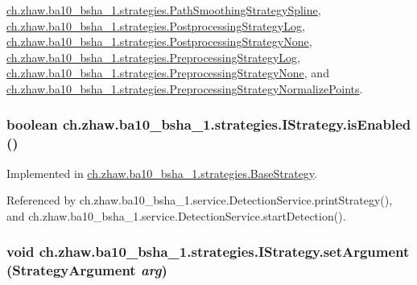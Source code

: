 \hyperlink{classch_1_1zhaw_1_1ba10__bsha__1_1_1strategies_1_1PathSmoothingStrategySpline_a4f2972f63f03c195fa006367e8e745c6}{ch.zhaw.ba10\_\-bsha\_\-1.strategies.PathSmoothingStrategySpline}, \hyperlink{classch_1_1zhaw_1_1ba10__bsha__1_1_1strategies_1_1PostprocessingStrategyLog_af34bf152422d8a8ebc3540f317764e65}{ch.zhaw.ba10\_\-bsha\_\-1.strategies.PostprocessingStrategyLog}, \hyperlink{classch_1_1zhaw_1_1ba10__bsha__1_1_1strategies_1_1PostprocessingStrategyNone_afb92557a36f60e5b88cce17eddc688d9}{ch.zhaw.ba10\_\-bsha\_\-1.strategies.PostprocessingStrategyNone}, \hyperlink{classch_1_1zhaw_1_1ba10__bsha__1_1_1strategies_1_1PreprocessingStrategyLog_acac70ca9f34f19eb4f6a762895b2ffec}{ch.zhaw.ba10\_\-bsha\_\-1.strategies.PreprocessingStrategyLog}, \hyperlink{classch_1_1zhaw_1_1ba10__bsha__1_1_1strategies_1_1PreprocessingStrategyNone_a76d2204685b040adc9183d5ea705ef8c}{ch.zhaw.ba10\_\-bsha\_\-1.strategies.PreprocessingStrategyNone}, and \hyperlink{classch_1_1zhaw_1_1ba10__bsha__1_1_1strategies_1_1PreprocessingStrategyNormalizePoints_a933e6d434685d7273ddf132419f8738b}{ch.zhaw.ba10\_\-bsha\_\-1.strategies.PreprocessingStrategyNormalizePoints}.\hypertarget{interfacech_1_1zhaw_1_1ba10__bsha__1_1_1strategies_1_1IStrategy_a64149a1aad4d39dde043d11b2e7cc673}{
\subsubsection[{isEnabled}]{\setlength{\rightskip}{0pt plus 5cm}boolean ch.zhaw.ba10\_\-bsha\_\-1.strategies.IStrategy.isEnabled ()}}
\label{interfacech_1_1zhaw_1_1ba10__bsha__1_1_1strategies_1_1IStrategy_a64149a1aad4d39dde043d11b2e7cc673}


Implemented in \hyperlink{classch_1_1zhaw_1_1ba10__bsha__1_1_1strategies_1_1BaseStrategy_ad8e0e57f59a0ca49b27f205a39f2b8ae}{ch.zhaw.ba10\_\-bsha\_\-1.strategies.BaseStrategy}.

Referenced by ch.zhaw.ba10\_\-bsha\_\-1.service.DetectionService.printStrategy(), and ch.zhaw.ba10\_\-bsha\_\-1.service.DetectionService.startDetection().\hypertarget{interfacech_1_1zhaw_1_1ba10__bsha__1_1_1strategies_1_1IStrategy_aa5cbdd49578bcc84207fc073bc91da99}{
\subsubsection[{setArgument}]{\setlength{\rightskip}{0pt plus 5cm}void ch.zhaw.ba10\_\-bsha\_\-1.strategies.IStrategy.setArgument ({\bf StrategyArgument} {\em arg})}}
\label{interfacech_1_1zhaw_1_1ba10__bsha__1_1_1strategies_1_1IStrategy_aa5cbdd49578bcc84207fc073bc91da99}


